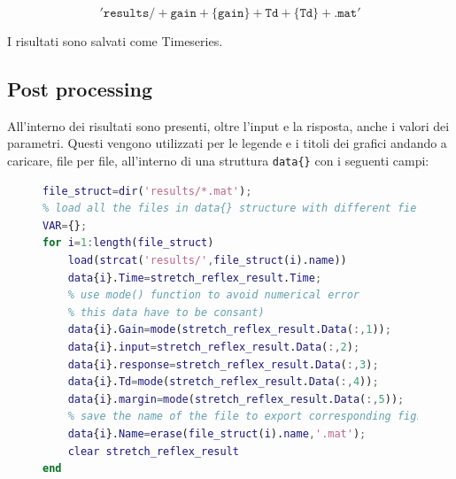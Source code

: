 \begin{equation*}
	'\mathtt{results/}+\mathtt{gain}+\{\mathtt{gain}\}+\mathtt{Td}+\{\mathtt{Td}\}+\mathtt{.mat}'
\end{equation*}

I risultati sono salvati come Timeseries.

\subsection{Post processing}

All'interno dei risultati sono presenti, oltre l'input e la risposta, anche i valori dei parametri. Questi vengono utilizzati per le legende e i titoli dei grafici andando a caricare, file per file, all'interno di una struttura \texttt{data\{\}} con i seguenti campi:

\begin{figure}[h!]
\begin{lstlisting}[language=matlab,style=mystyle]
file_struct=dir('results/*.mat');
% load all the files in data{} structure with different fields
VAR={};
for i=1:length(file_struct)
	load(strcat('results/',file_struct(i).name))
	data{i}.Time=stretch_reflex_result.Time;
	% use mode() function to avoid numerical error
	% this data have to be consant)
	data{i}.Gain=mode(stretch_reflex_result.Data(:,1));
	data{i}.input=stretch_reflex_result.Data(:,2);
	data{i}.response=stretch_reflex_result.Data(:,3);
	data{i}.Td=mode(stretch_reflex_result.Data(:,4));
	data{i}.margin=mode(stretch_reflex_result.Data(:,5));
	% save the name of the file to export corresponding figs
	data{i}.Name=erase(file_struct(i).name,'.mat');
	clear stretch_reflex_result
end
\end{lstlisting}
\end{figure}



